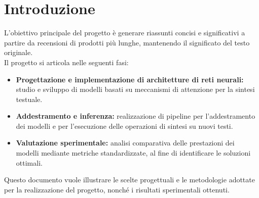 \section{Introduzione}
L'obiettivo principale del progetto è generare riassunti concisi e significativi a partire da recensioni di prodotti più lunghe, mantenendo il significato del testo originale.\\
Il progetto si articola nelle seguenti fasi:
\begin{itemize}
    \item \textbf{Progettazione e implementazione di architetture di reti neurali:} studio e sviluppo di modelli basati su meccanismi di attenzione per la sintesi testuale.
    \item \textbf{Addestramento e inferenza:} realizzazione di pipeline per l'addestramento dei modelli e per l'esecuzione delle operazioni di sintesi su nuovi testi.
    \item \textbf{Valutazione sperimentale:} analisi comparativa delle prestazioni dei modelli mediante metriche standardizzate, al fine di identificare le soluzioni ottimali.
\end{itemize}
Questo documento vuole illustrare le scelte progettuali e le metodologie adottate per la realizzazione del progetto, nonché i risultati sperimentali ottenuti.